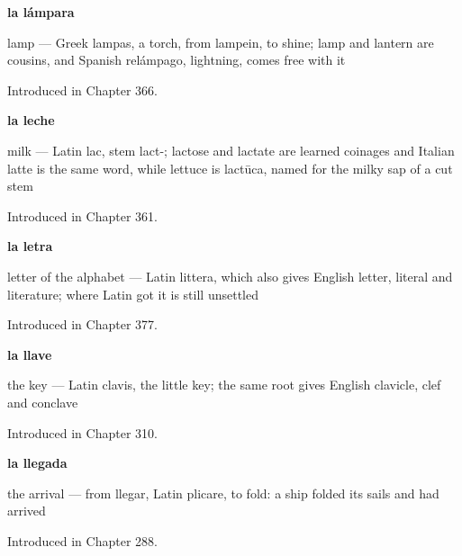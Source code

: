 \noindent\begin{minipage}[t]{\linewidth}
\raggedright
\textbf{la lámpara}\par
\small lamp — Greek lampas, a torch, from lampein, to shine; lamp and lantern are cousins, and Spanish relámpago, lightning, comes free with it\par
\footnotesize Introduced in Chapter 366.
\end{minipage}\par\medskip

\noindent\begin{minipage}[t]{\linewidth}
\raggedright
\textbf{la leche}\par
\small milk — Latin lac, stem lact-; lactose and lactate are learned coinages and Italian latte is the same word, while lettuce is lactūca, named for the milky sap of a cut stem\par
\footnotesize Introduced in Chapter 361.
\end{minipage}\par\medskip

\noindent\begin{minipage}[t]{\linewidth}
\raggedright
\textbf{la letra}\par
\small letter of the alphabet — Latin littera, which also gives English letter, literal and literature; where Latin got it is still unsettled\par
\footnotesize Introduced in Chapter 377.
\end{minipage}\par\medskip

\noindent\begin{minipage}[t]{\linewidth}
\raggedright
\textbf{la llave}\par
\small the key — Latin clavis, the little key; the same root gives English clavicle, clef and conclave\par
\footnotesize Introduced in Chapter 310.
\end{minipage}\par\medskip

\noindent\begin{minipage}[t]{\linewidth}
\raggedright
\textbf{la llegada}\par
\small the arrival — from llegar, Latin plicare, to fold: a ship folded its sails and had arrived\par
\footnotesize Introduced in Chapter 288.
\end{minipage}\par\medskip


